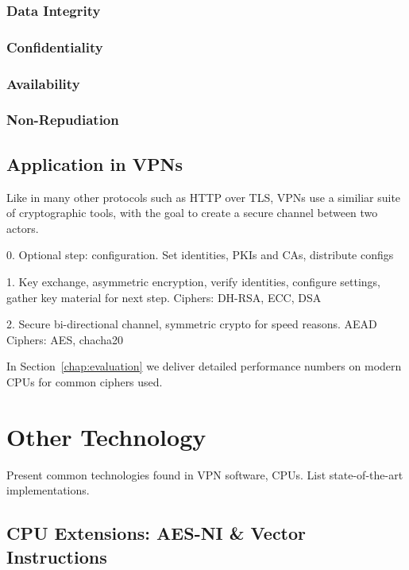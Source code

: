 \subsubsection{Data Integrity}

\subsubsection{Confidentiality}

\subsubsection{Availability}

\subsubsection{Non-Repudiation}

\subsection{Application in VPNs}
Like in many other protocols such as HTTP over TLS, VPNs use a similiar suite of cryptographic tools, with the goal to create a secure channel between two actors.

0. Optional step: configuration. Set identities, PKIs and CAs, distribute configs

1. Key exchange, asymmetric encryption, verify identities, configure settings, gather key material for next step.
Ciphers: DH-RSA, ECC, DSA

2. Secure bi-directional channel, symmetric crypto for speed reasons. AEAD
Ciphers: AES, chacha20

In Section~\ref{chap:evaluation} we deliver detailed performance numbers on modern CPUs for common ciphers used.


\section{Other Technology}
Present common technologies found in VPN software, CPUs. List state-of-the-art implementations.
\subsection{CPU Extensions: AES-NI \& Vector Instructions}

